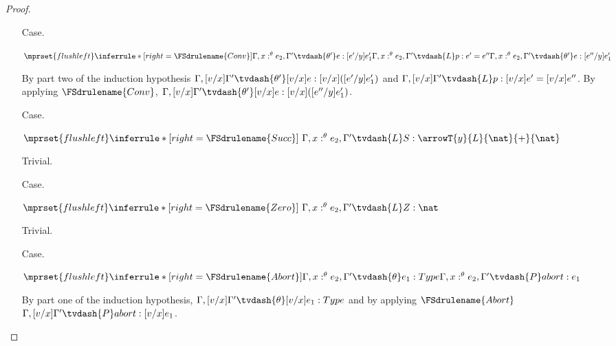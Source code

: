 \begin{proof}
\begin{itemize}
   \item[Case.]\ \\
     \begin{center}
       \begin{math}
         $$\mprset{flushleft}
         \inferrule* [right=\FSdrulename{Conv}] {
           \Gamma,x:^\theta e_2,\Gamma' \tvdash{\theta'} e:[e'/y]e'_1
           \\\\
           \Gamma,x:^\theta e_2,\Gamma' \tvdash{L} p:e' = e''
         }{\Gamma,x:^\theta e_2,\Gamma' \tvdash{\theta'} e:[e''/y]e'_1}
       \end{math}
     \end{center}
     By part two of the induction hypothesis 
     $\Gamma,[v/x]\Gamma' \tvdash{\theta'} [v/x]e:[v/x]([e'/y]e'_1)$ and
     $\Gamma,[v/x]\Gamma' \tvdash{L} p:[v/x]e' = [v/x]e''$.  By applying $\FSdrulename{Conv}$,
     $\Gamma,[v/x]\Gamma' \tvdash{\theta'} [v/x]e:[v/x]([e''/y]e'_1)$.

   \item[Case.]\ \\
     \begin{center}
       \begin{math}
         $$\mprset{flushleft}
         \inferrule* [right=\FSdrulename{Succ}] {
           \ 
         }{\Gamma, x:^\theta e_2,\Gamma' \tvdash{L} S:\arrowT{y}{L}{\nat}{+}{\nat}}
       \end{math}
     \end{center}
     Trivial.

   \item[Case.]\ \\
     \begin{center}
       \begin{math}
         $$\mprset{flushleft}
         \inferrule* [right=\FSdrulename{Zero}] {
           \ 
         }{\Gamma, x:^\theta e_2,\Gamma' \tvdash{L} Z:\nat}
       \end{math}
     \end{center}
     Trivial.
     
   \item[Case.]\ \\
     \begin{center}
       \begin{math}
         $$\mprset{flushleft}
         \inferrule* [right=\FSdrulename{Abort}] {
           \Gamma, x:^\theta e_2,\Gamma' \tvdash{\theta} e_1:Type
         }{\Gamma, x:^\theta e_2,\Gamma' \tvdash{P} abort:e_1}
       \end{math}
     \end{center}
     By part one of the induction hypothesis,
     $\Gamma, [v/x]\Gamma' \tvdash{\theta} [v/x]e_1:Type$ and by applying
     $\FSdrulename{Abort}$ 
     $\Gamma, [v/x]\Gamma' \tvdash{P} abort:[v/x]e_1$.


\end{itemize}
\end{proof}
